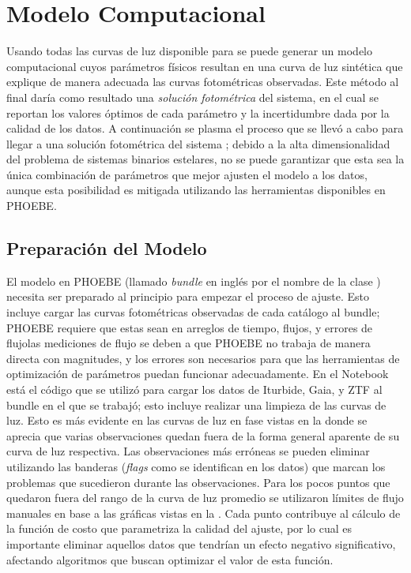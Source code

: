\chapter{Modelo Computacional} \label{metodologia:modelocomputacional}

Usando todas las curvas de luz disponible para \atoObjId se puede
generar un modelo computacional cuyos parámetros físicos resultan en una curva
de luz sintética que explique de manera adecuada las curvas fotométricas
observadas. Este método al final daría como resultado una \textit{solución
fotométrica} del sistema, en el cual se reportan los valores óptimos de cada
parámetro y la incertidumbre dada por la calidad de los datos. A continuación se
plasma el proceso que se llevó a cabo para llegar a una solución fotométrica del
sistema \atoObjIdNoSpace; debido a la alta dimensionalidad del problema de
sistemas binarios estelares, no se puede garantizar que esta sea la única
combinación de parámetros que mejor ajusten el modelo a los datos, aunque esta
posibilidad es mitigada utilizando las herramientas disponibles en PHOEBE.

\section{Preparación del Modelo} \label{metodologia:modelocomputacional:preparacion_modelo}

El modelo en PHOEBE (llamado \textit{bundle} en inglés por el nombre de la clase
) necesita ser preparado al principio para empezar el
proceso de ajuste. Esto incluye cargar las curvas fotométricas observadas de
cada catálogo al bundle; PHOEBE requiere que estas sean en arreglos de tiempo,
flujos, y errores de flujo\textemdash las mediciones de flujo se deben a que
PHOEBE no trabaja de manera directa con magnitudes, y los errores son necesarios
para que las herramientas de optimización de parámetros puedan funcionar
adecuadamente. En el Notebook
\href{https://github.com/KnightIV/UANL_MAPTA_Observaciones/blob/main/analisis/phoebe_model/initial-model-prep.ipynb}{}
está el código que se utilizó para cargar los datos de Iturbide, Gaia, y ZTF al
bundle en el que se trabajó; esto incluye realizar una limpieza de las curvas de
luz. Esto es más evidente en las curvas de luz en fase vistas en la
 donde se aprecia que varias
observaciones quedan fuera de la forma general aparente de su curva de luz
respectiva. Las observaciones más erróneas se pueden eliminar utilizando las
banderas (\textit{flags} como se identifican en los datos) que marcan los
problemas que sucedieron durante las observaciones. Para los pocos puntos que
quedaron fuera del rango de la curva de luz promedio se utilizaron límites de
flujo manuales en base a las gráficas vistas en la
. Cada punto contribuye al cálculo de
la función de costo que parametriza la calidad del ajuste, por lo cual es
importante eliminar aquellos datos que tendrían un efecto negativo
significativo, afectando algoritmos que buscan optimizar el valor de esta
función.

